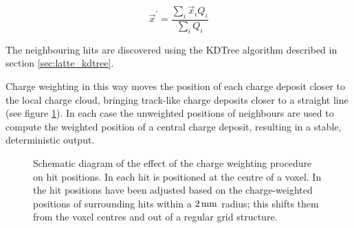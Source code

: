 \begin{equation}\label{eqn:charge_weighted_avg_position}
	\vec{x}^\prime = \frac{\displaystyle \sum_i \vec{x}_i Q_i}{\displaystyle \sum_i Q_i}
\end{equation}

The neighbouring hits are discovered using the \ac{KDTree} algorithm described in section \ref{sec:latte_kdtree}.

Charge weighting in this way moves the position of each charge deposit closer to the local charge cloud, bringing track-like charge deposits closer to a straight line (see figure \ref{fig:ca_charge_weighting}). In each case the unweighted positions of neighbours are used to compute the weighted position of a central charge deposit, resulting in a stable, deterministic output.

\begin{figure}
\centering
{}
\caption[Diagram of the effect of charge weighting on hit position]{\label{fig:ca_charge_weighting}Schematic diagram of the effect of the charge weighting procedure on hit positions. In  each hit is positioned at the centre of a voxel. In  the hit positions have been adjusted based on the charge-weighted positions of surrounding hits within a $2\,\mathrm{mm}$ radius; this shifts them from the voxel centres and out of a regular grid structure.}
\end{figure}

